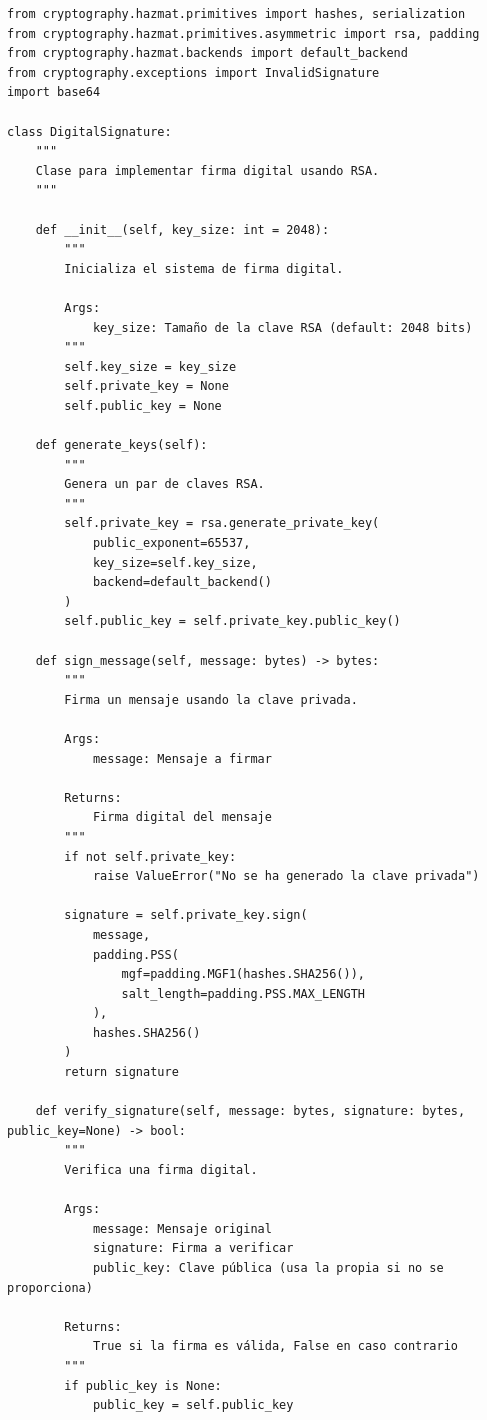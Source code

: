 \documentclass[12pt,a4paper]{article}
\begin{document}
\begin{lstlisting}[caption=Implementación de firma digital con RSA]
from cryptography.hazmat.primitives import hashes, serialization
from cryptography.hazmat.primitives.asymmetric import rsa, padding
from cryptography.hazmat.backends import default_backend
from cryptography.exceptions import InvalidSignature
import base64

class DigitalSignature:
    """
    Clase para implementar firma digital usando RSA.
    """
    
    def __init__(self, key_size: int = 2048):
        """
        Inicializa el sistema de firma digital.
        
        Args:
            key_size: Tamaño de la clave RSA (default: 2048 bits)
        """
        self.key_size = key_size
        self.private_key = None
        self.public_key = None
        
    def generate_keys(self):
        """
        Genera un par de claves RSA.
        """
        self.private_key = rsa.generate_private_key(
            public_exponent=65537,
            key_size=self.key_size,
            backend=default_backend()
        )
        self.public_key = self.private_key.public_key()
        
    def sign_message(self, message: bytes) -> bytes:
        """
        Firma un mensaje usando la clave privada.
        
        Args:
            message: Mensaje a firmar
            
        Returns:
            Firma digital del mensaje
        """
        if not self.private_key:
            raise ValueError("No se ha generado la clave privada")
            
        signature = self.private_key.sign(
            message,
            padding.PSS(
                mgf=padding.MGF1(hashes.SHA256()),
                salt_length=padding.PSS.MAX_LENGTH
            ),
            hashes.SHA256()
        )
        return signature
    
    def verify_signature(self, message: bytes, signature: bytes, public_key=None) -> bool:
        """
        Verifica una firma digital.
        
        Args:
            message: Mensaje original
            signature: Firma a verificar
            public_key: Clave pública (usa la propia si no se proporciona)
            
        Returns:
            True si la firma es válida, False en caso contrario
        """
        if public_key is None:
            public_key = self.public_key
            

\end{lstlisting}
\end{document}
